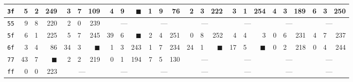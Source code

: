 \begin{tabular}{| c | r@{.} l@{\quad}r | r@{.} l@{\quad}r | r@{.} l@{\quad}r | r@{.} l@{\quad}r | r@{.} l@{\quad}r | r@{.} l@{\quad}r | r@{.} l@{\quad}r | r@{.} l@{\quad}r |}
	\hline
	{\tt 3f}&5&2&249&3&7&109&4&9&{\weak$\blacksquare$}&1&9&76&2&3&222&3&1&254&4&3&189&6&3&250\\
	\hline
	{\tt 55}&9&8&220&2&0&239&\multicolumn{3}{c|}{---}&\multicolumn{3}{c|}{---}&\multicolumn{3}{c|}{---}&\multicolumn{3}{c|}{---}&\multicolumn{3}{c|}{---}&\multicolumn{3}{c|}{---}\\
	\hline
	{\tt 5f}&6&1&225&5&7&245&39&6&{$\blacksquare$}&2&4&251&0&8&252&4&4&3&0&6&231&4&7&237\\
	\hline
	{\tt 6f}&3&4&86&34&3&{$\blacksquare$}&1&3&243&1&7&234&24&1&{$\blacksquare$}&17&5&{$\blacksquare$}&0&2&218&0&4&244\\
	\hline
	{\tt 77}&43&7&{$\blacksquare$}&2&2&219&0&1&194&7&5&130&\multicolumn{3}{c|}{---}&\multicolumn{3}{c|}{---}&\multicolumn{3}{c|}{---}&\multicolumn{3}{c|}{---}\\
	\hline
	{\tt ff}&0&0&223&\multicolumn{3}{c|}{---}&\multicolumn{3}{c|}{---}&\multicolumn{3}{c|}{---}&\multicolumn{3}{c|}{---}&\multicolumn{3}{c|}{---}&\multicolumn{3}{c|}{---}&\multicolumn{3}{c|}{---}\\
	\hline
\end{tabular}